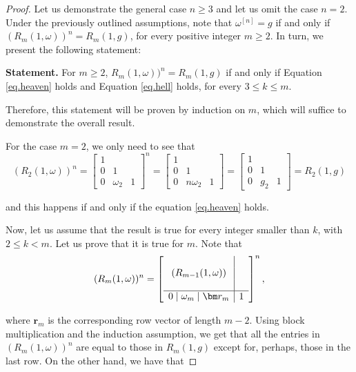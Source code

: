 \documentclass[preprint,12pt]{elsarticle}
\begin{document}
\begin{proof} Let us demonstrate the general case $n \geq 3$ and let us omit the case $n=2$. Under the previously outlined assumptions, note that $\omega^{[n]}=g$ if and only if $(R_m(1,\omega))^n=R_m(1,g)$, for every positive integer $m\geq 2$. In turn, we present the following statement:

\medskip

\noindent \textbf{Statement.} For $m\geq 2$, $R_m(1,\omega))^n=R_m(1,g)$ if and only if Equation \eqref{eq.heaven} holds and Equation \eqref{eq.hell} holds, for every $3\leq k\leq m$.

\medskip

Therefore, this statement will be proven by induction on $m$, which will suffice to demonstrate the overall result.

\noindent For the case $m=2$, we only need to see that
$$(R_2(1,\omega))^n=\begin{bmatrix} 1 \\ 0 & 1 \\ 0 & \omega_2 & 1 \end{bmatrix}^n=\begin{bmatrix}  1\\ 0 & 1 \\ 0 & n\omega_2 & 1 \end{bmatrix}=\begin{bmatrix}  1\\ 0 & 1 \\ 0 & g_2 & 1 \end{bmatrix}=R_2(1,g) $$


\noindent and this happens if and only if the equation \eqref{eq.heaven} holds.

\medskip


\noindent Now, let us assume that the result is true for every integer smaller than $k$, with $2\leq k < m$. Let us prove that it is true for $m$. Note that 
$$(R_m(1,\omega))^n=\left[\begin{array}{c  | c} &\\ (R_{m-1}(1,\omega)) &  \\ & \\ \hline 0 \mid \omega_m \mid\bm r_m  & 1  \end{array}\right]^n,$$


\noindent \noindent where $\bm r_m$ is the corresponding row vector of length $m-2$.  Using block multiplication and the induction assumption, we get that all the entries in $(R_m(1,\omega))^n$ are equal to those in $R_m(1,g)$ except for, perhaps, those in the last row. On the other hand, we have that


\end{proof}
\end{document}
